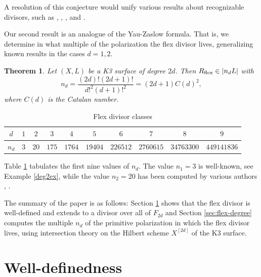 \documentclass{amsart}
\newtheorem{theorem}{Theorem}[section]
\theoremstyle{definition}
\begin{document}
A resolution of this conjecture would unify various results about recognizable divisors, such
as \cite{alexeev2019stable}, \cite{alexeev2020compactifications}, \cite{alexeev2021compact},
and \cite{alexeev2021nonsymplectic}.

Our second result is an analogue of the Yau-Zaslow formula. That is, we
determine in what multiple of the polarization the flex divisor lives,
generalizing known results in the cases $d=1,2$.

\begin{theorem} Let $(X,L)$ be a K3 surface of degree $2d$. Then $R_{\rm flex}\in |n_dL|$ with
$$n_d= \frac{(2d)!(2d+1)!}{d!^2(d+1)!^2} =(2d+1)C(d)^2,$$
where $C(d)$ is the Catalan number.
\end{theorem}

\vspace{-5pt}

\begin{table}[h]
\begin{tabular}{c|ccccccccc}
$d$ & $1$ & $2$ & $3$ & $4$ & $5$ & $6$ & $7$ & $8$ & $9$   \\
\hline
$n_d$ & $3$ & $20$ & $175$ & $1764$ &
$19404$ & $226512$ & $2760615$ & $34763300$ & $449141836$ \\
\end{tabular}\vspace{3pt}
\caption{Flex divisor classes}
\label{tab-values}
\end{table}

\vspace{-5pt}

Table \ref{tab-values} tabulates the first nine values of $n_d$. The value $n_1=3$
is well-known, see Example \ref{deg2ex},
while the value $n_2=20$ has been computed by various authors
\cite[Prop.~8.8]{huybrechts2013curves},
\cite[Cor.~2.4.6]{witaszek2014geometry}.


The summary of the paper is as follows: Section \ref{sec:flex-defined} shows that the flex divisor
is well-defined and extends to a divisor over all of $F_{2d}$ and Section \ref{sec:flex-degree} computes
the multiple $n_d$ of the primitive polarization in which the flex divisor lives, using
 intersection theory on the Hilbert scheme $X^{[2d]}$ of the K3 surface.

\section{Well-definedness}
\label{sec:flex-defined}
\end{document}
